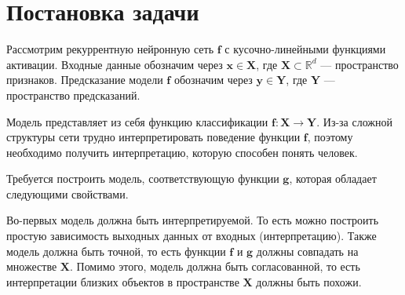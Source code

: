 \documentclass[a4paper, 12pt]{article}
\begin{document}
\section{Постановка задачи}
Рассмотрим рекуррентную нейронную сеть $\mathbf{f}$ с кусочно-линейными функциями активации. Входные данные обозначим через $\mathbf{x} \in \mathbf{X}$, где $\mathbf{X} \subset \mathbb{R}^d$ --- пространство признаков. Предсказание модели $\mathbf{f}$ обозначим через $\mathbf{y} \in \mathbf{Y}$, где $\mathbf{Y}$ --- пространство предсказаний.

Модель представляет из себя функцию классификации $\mathbf{f}: \mathbf{X} \to \mathbf{Y}$. Из-за сложной структуры сети трудно интерпретировать поведение функции $\mathbf{f}$, поэтому необходимо получить интерпретацию, которую способен понять человек.

Требуется построить модель, соответствующую функции $\mathbf{g}$, которая обладает следующими свойствами.

Во-первых модель должна быть интерпретируемой. То есть можно построить простую зависимость выходных данных от входных (интерпретацию). Также модель должна быть точной, то есть функции $\mathbf{f}$ и $\mathbf{g}$ должны совпадать на множестве $\mathbf{X}$. Помимо этого, модель должна быть согласованной, то есть интерпретации близких объектов в пространстве $\mathbf{X}$ должны быть похожи.



\end{document}
